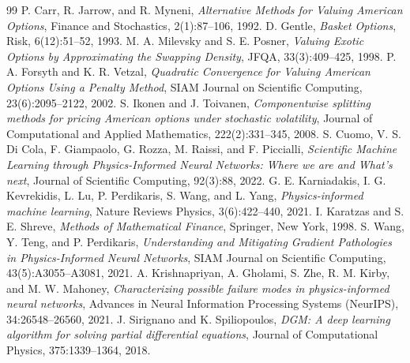 \documentclass[11pt,a4paper]{article}
\begin{document}
\begin{thebibliography}{99}
 P. Carr, R. Jarrow, and R. Myneni, \emph{Alternative Methods for Valuing American Options}, Finance and Stochastics, 2(1):87--106, 1992.
 D. Gentle, \emph{Basket Options}, Risk, 6(12):51--52, 1993.
 M. A. Milevsky and S. E. Posner, \emph{Valuing Exotic Options by Approximating the Swapping Density}, JFQA, 33(3):409--425, 1998.
 P. A. Forsyth and K. R. Vetzal, \emph{Quadratic Convergence for Valuing American Options Using a Penalty Method}, SIAM Journal on Scientific Computing, 23(6):2095--2122, 2002.
 S. Ikonen and J. Toivanen, \emph{Componentwise splitting methods for pricing American options under stochastic volatility}, Journal of Computational and Applied Mathematics, 222(2):331--345, 2008.
 S. Cuomo, V. S. Di Cola, F. Giampaolo, G. Rozza, M. Raissi, and F. Piccialli, \emph{Scientific Machine Learning through Physics-Informed Neural Networks: Where we are and What's next}, Journal of Scientific Computing, 92(3):88, 2022.
 G. E. Karniadakis, I. G. Kevrekidis, L. Lu, P. Perdikaris, S. Wang, and L. Yang, \emph{Physics-informed machine learning}, Nature Reviews Physics, 3(6):422--440, 2021.
 I. Karatzas and S. E. Shreve, \emph{Methods of Mathematical Finance}, Springer, New York, 1998.
 S. Wang, Y. Teng, and P. Perdikaris, \emph{Understanding and Mitigating Gradient Pathologies in Physics-Informed Neural Networks}, SIAM Journal on Scientific Computing, 43(5):A3055--A3081, 2021.
 A. Krishnapriyan, A. Gholami, S. Zhe, R. M. Kirby, and M. W. Mahoney, \emph{Characterizing possible failure modes in physics-informed neural networks}, Advances in Neural Information Processing Systems (NeurIPS), 34:26548--26560, 2021.
 J. Sirignano and K. Spiliopoulos, \emph{DGM: A deep learning algorithm for solving partial differential equations}, Journal of Computational Physics, 375:1339--1364, 2018.
\end{thebibliography}
\end{document}
